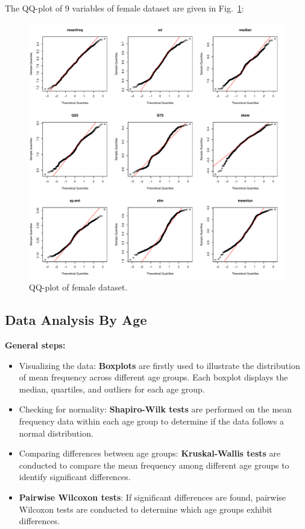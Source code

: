 \documentclass{article}
\begin{document}
	The QQ-plot of 9 variables of female dataset are given in Fig.~\ref{qq_female}:
	\begin{figure}
		\centering
		\includegraphics[width=\textwidth]{graphs/gender/qq_plot_female.pdf}
		\caption{QQ-plot of female dataset.}
		\label{qq_female}
	\end{figure}
	
	\subsection{Data Analysis By Age}
	\textbf{General steps:}
	\begin{itemize}
		\item Visualizing the data: \textbf{Boxplots} are firstly used to illustrate the distribution of mean frequency across different age groups. Each boxplot displays the median, quartiles, and outliers for each age group.
		\item Checking for normality: \textbf{Shapiro-Wilk tests} are performed on the mean frequency data within each age group to determine if the data follows a normal distribution.
		\item Comparing differences between age groups: \textbf{Kruskal-Wallis tests} are conducted to compare the mean frequency among different age groups to identify significant differences.
		\item \textbf{Pairwise Wilcoxon tests}: If significant differences are found, pairwise Wilcoxon tests are conducted to determine which age groups exhibit differences.
	\end{itemize}
	
\end{document}
